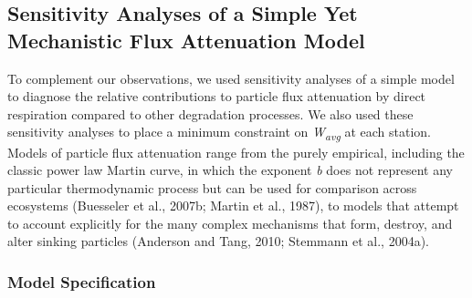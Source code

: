 \subsection{Sensitivity Analyses of a Simple Yet Mechanistic Flux Attenuation Model}

To complement our observations, we used sensitivity analyses of a simple model to diagnose the relative contributions to particle flux attenuation by direct respiration compared to other degradation processes. We also used these sensitivity analyses to place a minimum constraint on \emph{W\textsubscript{avg}} at each station. Models of particle flux attenuation range from the purely empirical, including the classic power law Martin curve, in which the exponent \emph{b} does not represent any particular thermodynamic process but can be used for comparison across ecosystems (Buesseler et al., 2007b; Martin et al., 1987), to models that attempt to account explicitly for the many complex mechanisms that form, destroy, and alter sinking particles (Anderson and Tang, 2010; Stemmann et al., 2004a).

\subsubsection{Model Specification}

